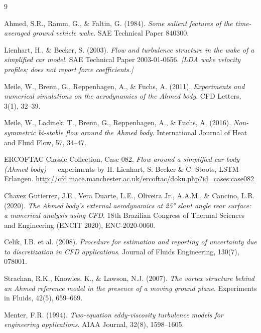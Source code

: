 \documentclass[12pt,a4paper]{article}
\begin{document}
\begin{thebibliography}{9}

Ahmed, S.R., Ramm, G., \& Faltin, G. (1984).
\textit{Some salient features of the time-averaged ground vehicle wake}.
SAE Technical Paper 840300.

Lienhart, H., \& Becker, S. (2003).
\textit{Flow and turbulence structure in the wake of a simplified car model}.
SAE Technical Paper 2003-01-0656.
\emph{[LDA wake velocity profiles; does not report force coefficients.]}

Meile, W., Brenn, G., Reppenhagen, A., \& Fuchs, A. (2011).
\textit{Experiments and numerical simulations on the aerodynamics of the Ahmed body}.
CFD Letters, 3(1), 32–39.

Meile, W., Ladinek, T., Brenn, G., Reppenhagen, A., \& Fuchs, A. (2016).
\textit{Non-symmetric bi-stable flow around the Ahmed body}.
International Journal of Heat and Fluid Flow, 57, 34–47.

ERCOFTAC Classic Collection, Case 082.
\textit{Flow around a simplified car body (Ahmed body)} — experiments by H. Lienhart, S. Becker \&
C. Stoots, LSTM Erlangen.
\url{http://cfd.mace.manchester.ac.uk/ercoftac/doku.php?id=cases:case082}

Chavez Gutierrez, J.E., Vera Duarte, L.E., Oliveira Jr., A.A.M., \& Cancino, L.R. (2020).
\textit{The Ahmed body's external aerodynamics at 25° slant angle rear surface: a numerical
analysis using CFD}.
18th Brazilian Congress of Thermal Sciences and Engineering (ENCIT 2020), ENC-2020-0060.

Celik, I.B. et al. (2008).
\textit{Procedure for estimation and reporting of uncertainty due to discretization in CFD applications}.
Journal of Fluids Engineering, 130(7), 078001.

Strachan, R.K., Knowles, K., \& Lawson, N.J. (2007).
\textit{The vortex structure behind an Ahmed reference model in the presence of a moving ground plane}.
Experiments in Fluids, 42(5), 659–669.

Menter, F.R. (1994).
\textit{Two-equation eddy-viscosity turbulence models for engineering applications}.
AIAA Journal, 32(8), 1598–1605.

\end{thebibliography}
\end{document}

